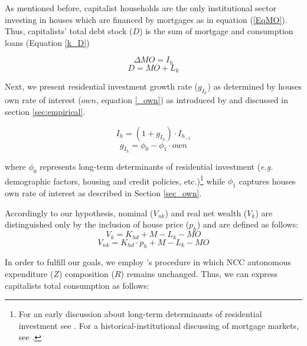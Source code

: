 \documentclass[11pt]{article}
\begin{document}
As mentioned before, capitalist households are the only institutional sector investing in houses which are financed by mortgages as in equation (\ref{EqMO}).
Thus, capitalists' total debt stock (\(D\)) is the sum of mortgage and consumption loans (Equation \ref{k_D})

\begin{equation}
  \label{EqMO}
  \Delta MO = I_h
\end{equation}
\begin{equation}
  \label{k_D}
  D =  MO + L_k
\end{equation}



Next, we present residential investment growth rate (\(g_{I_h}\)) as determined by houses own rate of interest (\(own\), equation \ref{_own}) as introduced by \textcite{teixeira_crescimento_2015} and discussed in section \ref{sec:empirical}.


\begin{equation}
	I_h = (1 + g_{I_h})\cdot I_{h_{-1}}
\end{equation}
\begin{equation}
	\label{g_Z_own}
	g_{I_h} = \phi_0 - \phi_1\cdot own
\end{equation}

where  \(\phi_0\) represents long-term determinants of residential investment (\emph{e.g.} demographic factors, housing and credit policies, etc.)\footnote{For an early discussion about long-term determinants of residential investment see \textcite{grebler_capital_1956}. For a historical-institutional discussing of mortgage markets, see \textcite{green_american_2005}.} while \(\phi_1\) captures houses own rate of interest as described in Section \ref{sec_own}.

Accordingly to our hypothesis, nominal (\(V_{nk}\)) and real net wealth (\(V_{k}\)) are distinguished only by the inclusion of house price (\(p_h\)) and are defined as follows:
\begin{equation}
V_{k} = K_{hd} + M - L_{k} - MO
\end{equation}
\begin{equation}
V_{nk} = K_{hd}\cdot p_h + M - L_{k} - MO
\end{equation}


In order to fulfill our goals, we employ \citeauthor*{freitas_baseline_2020}'s \citeyear{freitas_baseline_2020} procedure in which NCC autonomous expenditure (\(Z\)) composition (\(R\)) remains unchanged. Thus, we can express capitalists total consumption as follows:
\end{document}
